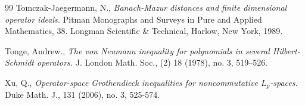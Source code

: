 \documentclass[a4paper,oneside,11pt, reqno]{amsart}
\numberwithin{equation}{section}
\theoremstyle{plain}
\begin{document}
\begin{thebibliography}{99}
 Tomczak-Jaegermann, N., \emph{Banach-Mazur distances and finite dimensional operator ideals.} Pitman Monographs and Surveys in Pure and Applied Mathematics, 38. Longman Scientific \& Technical, Harlow, New York, 1989. 

 Tonge, Andrew.,
\emph{The von Neumann inequality for polynomials in several Hilbert-Schmidt operators.}
J. London Math. Soc., (2) 18 (1978), no. 3, 519--526.

  Xu, Q., \emph{Operator-space Grothendieck inequalities for noncommutative $L_p$-spaces.} Duke Math. J., 131 (2006), no. 3, 525-574.

\end{thebibliography}
\end{document}
